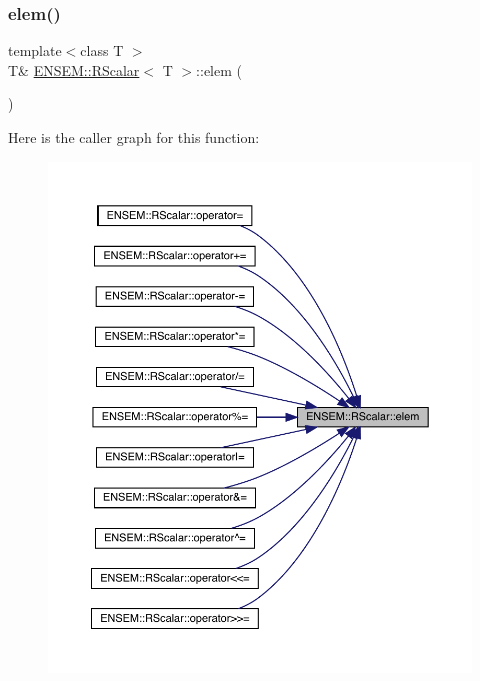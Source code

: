 \subsubsection{\texorpdfstring{elem()}{elem()}\hspace{0.1cm}{\footnotesize\ttfamily [1/6]}}
{\footnotesize\ttfamily template$<$class T $>$ \\
T\& \mbox{\hyperlink{classENSEM_1_1RScalar}{E\+N\+S\+E\+M\+::\+R\+Scalar}}$<$ T $>$\+::elem (\begin{DoxyParamCaption}{ }\end{DoxyParamCaption})\hspace{0.3cm}{\ttfamily [inline]}}

Here is the caller graph for this function\+:
\nopagebreak
\begin{figure}[H]
\begin{center}
\leavevmode
\includegraphics[width=350pt]{d0/d8c/classENSEM_1_1RScalar_ac1e3c3dba2379fdcea237f7c2bbb1e0e_icgraph}
\end{center}
\end{figure}
\mbox{\label{classENSEM_1_1RScalar_ac1e3c3dba2379fdcea237f7c2bbb1e0e}} 
